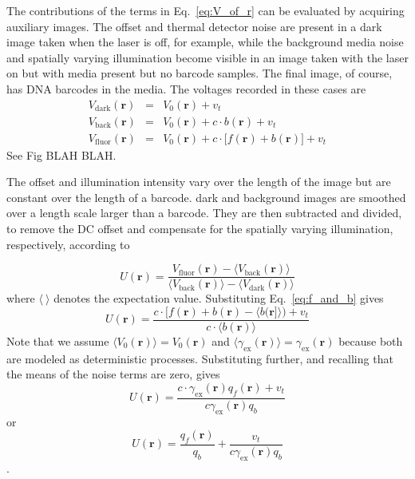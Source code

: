 The contributions of the terms in Eq.~\ref{eq:V_of_r} can be evaluated by acquiring auxiliary images. The offset and thermal detector noise are present in a dark image taken when the laser is off, for example, while the background media noise and spatially varying illumination become visible in an image taken with the laser on but with media present but no barcode samples. The final image, of course, has DNA barcodes in the media. The voltages recorded in these cases are
\begin{eqnarray}
V_{\text{dark}}(\mathbf{r})&=&V_0(\mathbf{r})+v_t\\
V_{\text{back}}(\mathbf{r})&=&V_0(\mathbf{r})+c \cdot  b(\mathbf{r})  +v_t\\
V_{\text{fluor}}(\mathbf{r})&=&V_0(\mathbf{r})+c \cdot \big[ f(\mathbf{r}) + b(\mathbf{r})\big]  +v_t
\end{eqnarray}
See Fig BLAH BLAH. 

The offset and illumination intensity vary over the length of the image but are constant over the length of a barcode. dark and background images are smoothed over a length scale larger than a barcode. They are then subtracted and divided, to remove the DC offset and compensate for the spatially varying illumination, respectively, according to

\begin{equation}
U(\mathbf{r})= \frac{ V_{\text{fluor}}(\mathbf{r}) - \langle V_{\text{back}}(\mathbf{r}) \rangle }{ \langle V_{\text{back}}(\mathbf{r}) \rangle - \langle V_{\text{dark}}(\mathbf{r}) \rangle}
\end{equation}
where $\langle~\rangle$ denotes the expectation value. 
Substituting Eq.~\ref{eq:f_and_b} gives
\begin{equation}
U(\mathbf{r})= \frac{ c \cdot \big[ f(\mathbf{r})  +b(\mathbf{r}) -\langle b(\mathbf{r}] \rangle \big)+ v_t  }{   c \cdot \langle b(\mathbf{r}) \rangle }
\end{equation}
Note that we assume $\langle V_0(\mathbf{r}) \rangle = V_0(\mathbf{r})$ and $\langle \gamma_{\text{ex}}(\mathbf{r}) \rangle  = \gamma_{\text{ex}}(\mathbf{r})$ because both are modeled as deterministic processes. Substituting further, and recalling that the means of the noise terms are zero, gives
\begin{equation}
U(\mathbf{r})= \frac{ c \cdot \gamma_{\text{ex}}(\mathbf{r}) q_f(\mathbf{r})  + v_t  }{     c \gamma_{\text{ex}}(\mathbf{r})  q_b }
\end{equation}
or
\begin{equation}\label{eq:realDeal}
U(\mathbf{r})= \frac{ q_f(\mathbf{r}) }{ q_b}   + \frac{ v_t }{   c \gamma_{\text{ex}}(\mathbf{r}) q_b} 
\end{equation}.


